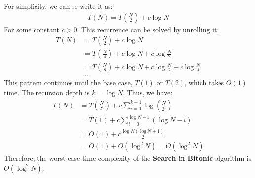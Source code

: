\documentclass[11pt, a4paper, oneside]{memoir}
\begin{document}
For simplicity, we can re-write it as:
\begin{align*}
    T(N) = T(\frac{N}{2}) + c\log N
\end{align*}
For some constant $c > 0$. This recurrence can be solved by unrolling it:
\begin{align*}
    T(N) &= T(\frac{N}{2}) + c\log N \\
    &= T(\frac{N}{4}) + c\log N + c\log \frac{N}{2} \\
    &= T(\frac{N}{8}) + c\log N + c\log \frac{N}{2} + c\log \frac{N}{4} \\
    &...
\end{align*}
This pattern continues until the base case, $T(1)$ or $T(2)$, which takes $O(1)$ time. The recursion depth is $k = \log N$. Thus, we have:
\begin{align*}
    T(N) &= T(\frac{N}{2^k}) + c \sum_{i=0}^{k-1} \log(\frac{N}{2^i}) \\
    &= T(1) + c \sum_{i=0}^{\log N - 1} (\log N - i) \\
    &= O(1) + c \frac{\log N (\log N + 1)}{2} \\
    &= O(1) +O(\log^2 N) = O(\log^2 N)
\end{align*}
Therefore, the worst-case time complexity of the \textbf{Search in Bitonic} algorithm is $O(\log^2 N)$.
\end{document}
